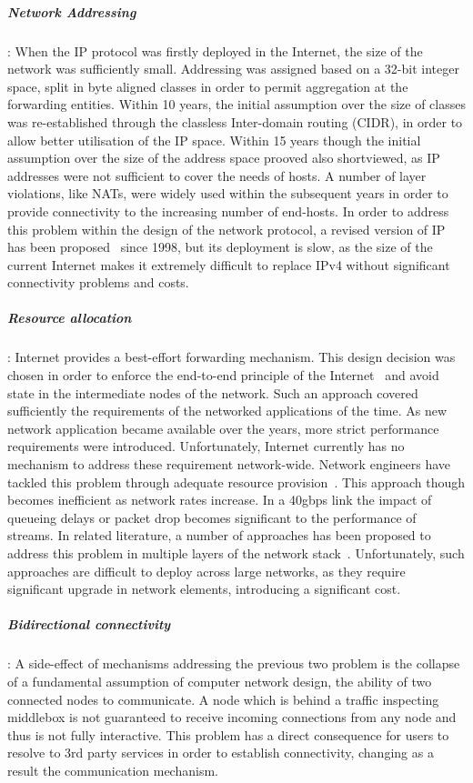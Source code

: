 \subparagraph*{Network Addressing}: When the IP protocol was firstly deployed in
the Internet, the size of the network was sufficiently small. Addressing was
assigned based on a 32-bit integer space, split in byte aligned classes in order to permit
aggregation at the forwarding entities. Within 10 years, the initial assumption
over the size of classes was re-established through the classless Inter-domain
routing (CIDR), in order to allow better utilisation of the IP space. Within 15
years  though the initial assumption over the size of the address space prooved
also shortviewed, as IP addresses were not sufficient to cover the needs of hosts.
A number of layer violations, like NATs, were widely used within the subsequent
years in order to provide connectivity to the increasing number of end-hosts. In
order to address this problem within the design of the network protocol, a
revised version of IP has been proposed~\cite{RFC2460} since 1998, but its
deployment is slow, as the size of the current Internet makes it extremely
difficult to replace IPv4 without significant connectivity problems and costs.

\subparagraph*{Resource allocation}: Internet provides 
a best-effort forwarding mechanism. This design decision was chosen in order to
enforce the end-to-end principle of the Internet~\cite{end2endIP} and avoid
state in the intermediate nodes of the network. Such an approach covered 
sufficiently the requirements of the networked applications of the time. As new
network application became available over the years, more strict performance
requirements were introduced. Unfortunately, Internet currently has no mechanism 
to address these requirement network-wide. Network engineers have tackled this
problem through adequate resource provision~\cite{TeiSha02}. This approach
though becomes inefficient as network rates increase. In a 40gbps link the impact
of queueing delays or packet drop becomes significant to the performance of streams.
In related literature, a number of approaches has been proposed to address this
problem in multiple layers of
the network stack~\cite{RFC5562, RFC2475, RFC3135}. Unfortunately, such
approaches are
difficult to deploy across large networks, as they require significant upgrade
in network elements, introducing a significant cost. 

\subparagraph*{Bidirectional connectivity}: A side-effect of mechanisms
addressing the previous two problem is the collapse of a fundamental assumption
of computer network design, the ability of two connected nodes to communicate. A
node which is behind a traffic inspecting middlebox is not guaranteed 
to receive incoming connections from any node and thus is not
fully interactive. This problem has a direct consequence for users to resolve
to 3rd party services in order to establish connectivity, changing as a result
the communication mechanism. 

